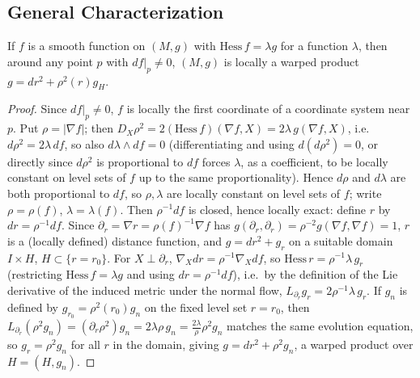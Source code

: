 \subsection{General Characterization}

\begin{theorem}
  \label{thm:pet-ch4-brinkmann-warped-product}
  If $f$ is a smooth function on $(M,g)$ with $\mathrm{Hess}\,f=\lambda g$ for a
  function $\lambda$, then around any point $p$ with $df|_p\ne0$, $(M,g)$ is
  locally a warped product $g=dr^2+\rho^2(r)g_H$.
\end{theorem}
\begin{proof}
  Since $df|_p\ne0$, $f$ is locally the first coordinate of a coordinate
  system near $p$. Put $\rho=|\nabla f|$; then
  $D_X\rho^2=2(\mathrm{Hess}\,f)(\nabla f,X)=2\lambda\,g(\nabla f,X)$, i.e.\
  $d\rho^2=2\lambda\,df$, so also $d\lambda\wedge df=0$ (differentiating and
  using $d(d\rho^2)=0$, or directly since $d\rho^2$ is proportional to $df$
  forces $\lambda$, as a coefficient, to be locally constant on level sets of
  $f$ up to the same proportionality). Hence $d\rho$ and $d\lambda$ are both
  proportional to $df$, so $\rho,\lambda$ are locally constant on level sets of
  $f$; write $\rho=\rho(f)$, $\lambda=\lambda(f)$. Then $\rho^{-1}df$ is closed,
  hence locally exact: define $r$ by $dr=\rho^{-1}df$. Since
  $\partial_r=\nabla r=\rho(f)^{-1}\nabla f$ has $g(\partial_r,\partial_r)=\rho^{-2}g(\nabla f,\nabla f)=1$,
  $r$ is a (locally defined) distance function, and $g=dr^2+g_r$ on a suitable
  domain $I\times H$, $H\subset\{r=r_0\}$. For $X\perp\partial_r$,
  $\nabla_Xdr=\rho^{-1}\nabla_Xdf$, so $\mathrm{Hess}\,r=\rho^{-1}\lambda\,g_r$
  (restricting $\mathrm{Hess}\,f=\lambda g$ and using $dr=\rho^{-1}df$), i.e.\ by
  the definition of the Lie derivative of the induced metric under the normal
  flow, $L_{\partial_r}g_r=2\rho^{-1}\lambda\,g_r$. If $g_n$ is defined by
  $g_{r_0}=\rho^2(r_0)g_n$ on the fixed level set $r=r_0$, then
  $L_{\partial_r}(\rho^2g_n)=(\partial_r\rho^2)g_n=2\lambda\rho\,g_n
  =\tfrac{2\lambda}\rho\rho^2g_n$ matches the same evolution equation, so
  $g_r=\rho^2g_n$ for all $r$ in the domain, giving $g=dr^2+\rho^2g_n$, a
  warped product over $H=(H,g_n)$.
\end{proof}

